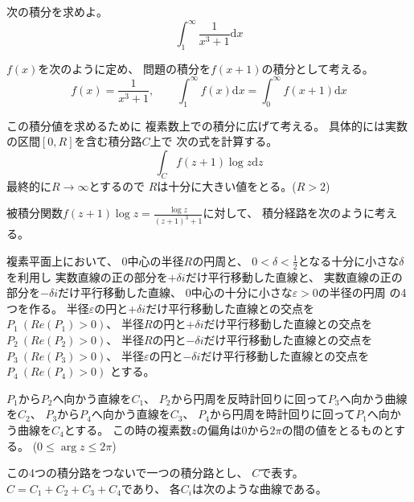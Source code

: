 \documentclass[12pt,b5paper]{ltjsarticle}
\begin{document}
\hrulefill

次の積分を求めよ。
\begin{equation}
 \int_{1}^{\infty} \frac{1}{x^3+1}\mathrm{d}x
\end{equation}

\dotfill

$f(x)$を次のように定め、
問題の積分を$f(x+1)$の積分として考える。
\begin{equation}
 f(x)=\frac{1}{x^3+1},\qquad
  \int_{1}^{\infty} f(x)\mathrm{d}x
  = \int_{0}^{\infty} f(x+1)\mathrm{d}x
\end{equation}

この積分値を求めるために
複素数上での積分に広げて考える。
具体的には実数の区間$[0,R]$を含む積分路$C$上で
次の式を計算する。
\begin{equation}
 \int_{C} f(z+1)\log{z}\mathrm{d}z
\end{equation}
最終的に$R\to\infty$とするので
$R$は十分に大きい値をとる。($R>2$)

被積分関数$f(z+1)\log{z}=\frac{\log{z}}{(z+1)^3+1}$に対して、
積分経路を次のように考える。

複素平面上において、
$0$中心の半径$R$の円周と、
$0< \delta <\frac{1}{2}$となる十分に小さな$\delta$を利用し
実数直線の正の部分を$+\delta i$だけ平行移動した直線と、
実数直線の正の部分を$-\delta i$だけ平行移動した直線、
$0$中心の十分に小さな$\varepsilon>0$の半径の円周
の4つを作る。
半径$\varepsilon$の円と$+\delta i$だけ平行移動した直線との交点を$P_1\ (Re(P_1)>0)$、
半径$R$の円と$+\delta i$だけ平行移動した直線との交点を$P_2\ (Re(P_2)>0)$、
半径$R$の円と$-\delta i$だけ平行移動した直線との交点を$P_3\ (Re(P_3)>0)$、
半径$\varepsilon$の円と$-\delta i$だけ平行移動した直線との交点を$P_4\ (Re(P_4)>0)$
とする。

$P_1$から$P_2$へ向かう直線を$C_1$、
$P_2$から円周を反時計回りに回って$P_3$へ向かう曲線を$C_2$、
$P_3$から$P_4$へ向かう直線を$C_3$、
$P_4$から円周を時計回りに回って$P_1$へ向かう曲線を$C_4$とする。
この時の複素数$z$の偏角は$0$から$2\pi$の間の値をとるものとする。
($0 \leq \arg{z} \leq 2\pi$)

この4つの積分路をつないで一つの積分路とし、
$C$で表す。
$C=C_1+C_2+C_3+C_4$であり、
各$C_{i}$は次のような曲線である。
\end{document}

